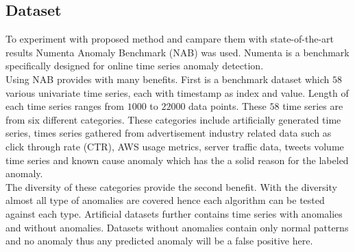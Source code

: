 \documentclass[12pt]{article}
\begin{document}
\subsection{Dataset}
To experiment with proposed method and campare them with state-of-the-art results Numenta Anomaly Benchmark (NAB) was used. Numenta is a benchmark specifically designed for online time series anomaly detection.\\
\break
Using NAB provides with many benefits. First is a benchmark dataset which $58$ various univariate time series, each with timestamp as index and value. Length of each time series ranges from $1000$ to $22000$ data points. These $58$ time series are from six different categories. These categories include artificially generated time series, times series gathered from advertisement industry related data such as click through rate (CTR), AWS usage metrics, server traffic data, tweets volume time series and known cause anomaly which has the a solid reason for the labeled anomaly.\\
\break
The diversity of these categories provide the second benefit. With the diversity almost all type of anomalies are covered hence each algorithm can be tested against each type. Artificial datasets further contains time series with anomalies and without anomalies. Datasets without anomalies contain only normal patterns and no anomaly thus any predicted anomaly will be a false positive here. 
\end{document}
